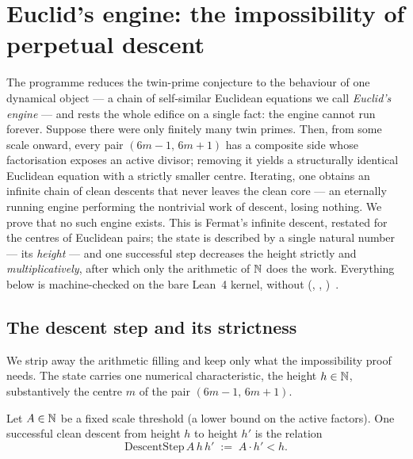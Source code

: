 \section{Euclid's engine: the impossibility of perpetual descent}\label{sec:engine}

The programme reduces the twin-prime conjecture to the behaviour of one dynamical object --- a
chain of self-similar Euclidean equations we call \emph{Euclid's engine} --- and rests the whole
edifice on a single fact: the engine cannot run forever. Suppose there were only finitely many
twin primes. Then, from some scale onward, every pair $(6m-1,\,6m+1)$ has a composite side whose
factorisation exposes an active divisor; removing it yields a structurally identical Euclidean
equation with a strictly smaller centre. Iterating, one obtains an infinite chain of clean
descents that never leaves the clean core --- an eternally running engine performing the
nontrivial work of descent, losing nothing. We prove that no such engine exists. This is Fermat's
infinite descent, restated for the centres of Euclidean pairs; the state is described by a single
natural number --- its \emph{height} --- and one successful step decreases the height strictly and
\emph{multiplicatively}, after which only the arithmetic of $\mathbb{N}$ does the work. Everything below is
machine-checked on the bare Lean~4 kernel, without 
(, ,
)~\cite{lean4,euclidspath-repo}.

\subsection{The descent step and its strictness}

We strip away the arithmetic filling and keep only what the impossibility proof needs. The state
carries one numerical characteristic, the height $h\in\mathbb{N}$, substantively the centre $m$ of the
pair $(6m-1,\,6m+1)$.

\begin{definition}\label{thm:DescentStep}
Let $A\in\mathbb{N}$ be a fixed scale threshold (a lower bound on the active factors). One successful clean
descent from height $h$ to height $h'$ is the relation
\begin{equation}\label{eq:descentstep}
  \mathrm{DescentStep}\,A\,h\,h' \;:=\; A\cdot h' < h.
\end{equation}
\end{definition}

